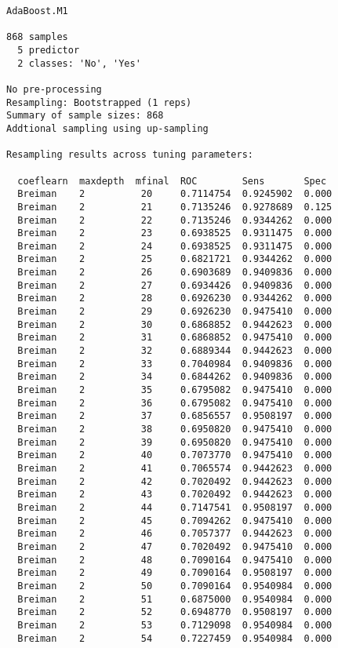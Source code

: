 \documentclass[11pt]{article}
\begin{document}
    \begin{Verbatim}[commandchars=\\\{\}]
AdaBoost.M1 

868 samples
  5 predictor
  2 classes: 'No', 'Yes' 

No pre-processing
Resampling: Bootstrapped (1 reps) 
Summary of sample sizes: 868 
Addtional sampling using up-sampling

Resampling results across tuning parameters:

  coeflearn  maxdepth  mfinal  ROC        Sens       Spec 
  Breiman    2          20     0.7114754  0.9245902  0.000
  Breiman    2          21     0.7135246  0.9278689  0.125
  Breiman    2          22     0.7135246  0.9344262  0.000
  Breiman    2          23     0.6938525  0.9311475  0.000
  Breiman    2          24     0.6938525  0.9311475  0.000
  Breiman    2          25     0.6821721  0.9344262  0.000
  Breiman    2          26     0.6903689  0.9409836  0.000
  Breiman    2          27     0.6934426  0.9409836  0.000
  Breiman    2          28     0.6926230  0.9344262  0.000
  Breiman    2          29     0.6926230  0.9475410  0.000
  Breiman    2          30     0.6868852  0.9442623  0.000
  Breiman    2          31     0.6868852  0.9475410  0.000
  Breiman    2          32     0.6889344  0.9442623  0.000
  Breiman    2          33     0.7040984  0.9409836  0.000
  Breiman    2          34     0.6844262  0.9409836  0.000
  Breiman    2          35     0.6795082  0.9475410  0.000
  Breiman    2          36     0.6795082  0.9475410  0.000
  Breiman    2          37     0.6856557  0.9508197  0.000
  Breiman    2          38     0.6950820  0.9475410  0.000
  Breiman    2          39     0.6950820  0.9475410  0.000
  Breiman    2          40     0.7073770  0.9475410  0.000
  Breiman    2          41     0.7065574  0.9442623  0.000
  Breiman    2          42     0.7020492  0.9442623  0.000
  Breiman    2          43     0.7020492  0.9442623  0.000
  Breiman    2          44     0.7147541  0.9508197  0.000
  Breiman    2          45     0.7094262  0.9475410  0.000
  Breiman    2          46     0.7057377  0.9442623  0.000
  Breiman    2          47     0.7020492  0.9475410  0.000
  Breiman    2          48     0.7090164  0.9475410  0.000
  Breiman    2          49     0.7090164  0.9508197  0.000
  Breiman    2          50     0.7090164  0.9540984  0.000
  Breiman    2          51     0.6875000  0.9540984  0.000
  Breiman    2          52     0.6948770  0.9508197  0.000
  Breiman    2          53     0.7129098  0.9540984  0.000
  Breiman    2          54     0.7227459  0.9540984  0.000

\end{Verbatim}
\end{document}
